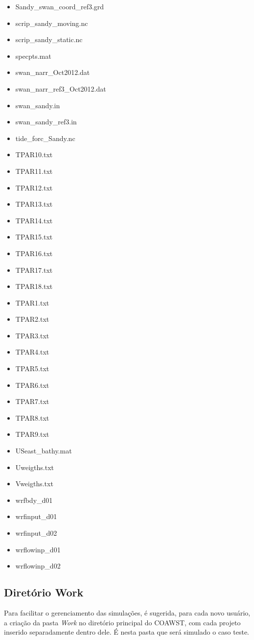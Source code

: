\begin{itemize}
\item Sandy\_swan\_coord\_ref3.grd
\item scrip\_sandy\_moving.nc
\item scrip\_sandy\_static.nc
\item specpts.mat
\item swan\_narr\_Oct2012.dat
\item swan\_narr\_ref3\_Oct2012.dat
\item swan\_sandy.in
\item swan\_sandy\_ref3.in
\item tide\_forc\_Sandy.nc
\item TPAR10.txt
\item TPAR11.txt
\item TPAR12.txt
\item TPAR13.txt
\item TPAR14.txt
\item TPAR15.txt
\item TPAR16.txt
\item TPAR17.txt
\item TPAR18.txt
\item TPAR1.txt
\item TPAR2.txt
\item TPAR3.txt
\item TPAR4.txt
\item TPAR5.txt
\item TPAR6.txt
\item TPAR7.txt
\item TPAR8.txt
\item TPAR9.txt
\item USeast\_bathy.mat
\item Uweigths.txt
\item Vweigths.txt
\item wrfbdy\_d01
\item wrfinput\_d01
\item wrfinput\_d02
\item wrflowinp\_d01
\item wrflowinp\_d02
\end{itemize}
\bigskip

\subsection{Diretório Work}\label{workcoawstsec}
\bigskip

\noindent Para facilitar o gerenciamento das simulações, é sugerida, para cada novo usuário, a criação da pasta \textit{Work} no diretório principal do COAWST, com cada projeto inserido separadamente dentro dele. É nesta pasta que será simulado o caso teste.
\bigskip

